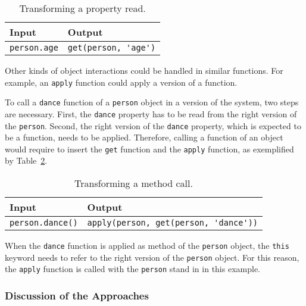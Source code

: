 \begin{table}[h]
\begin{center}
\begin{tabular}{| l | l |}
    \hline
    Input & Output \\ \hline
    \lstinline|person.age| & \lstinline|get(person, 'age')| \\ \hline
\end{tabular}
\end{center}
\caption[Table caption text]{Transforming a property read.}
\label{table:transformingReads}
\end{table}


Other kinds of object interactions could be handled in similar functions.
For example, an \lstinline{apply} function could apply a version of a function.

To call a \lstinline{dance} function of a \lstinline{person} object in a version of the system, two steps are necessary.
First, the \lstinline{dance} property has to be read from the right version of the \lstinline{person}.
Second, the right version of the \lstinline{dance} property, which is expected to be a function, needs to be applied.
Therefore, calling a function of an object would require to insert the \lstinline{get} function and the \lstinline{apply} function, as exemplified by Table~\ref{table:transformingMethodCall}.

\begin{table}[h]
\begin{center}
\begin{tabular}{| l | l |}
    \hline
    Input & Output \\ \hline
    \lstinline|person.dance()| & \lstinline|apply(person, get(person, 'dance'))| \\ \hline
\end{tabular}
\end{center}
\caption[Table caption text]{Transforming a method call.}
\label{table:transformingMethodCall}
\end{table}

When the \lstinline{dance} function is applied as method of the \lstinline{person} object, the \lstinline{this} keyword needs to refer to the right version of the \lstinline{person} object.
For this reason, the \lstinline{apply} function is called with the \lstinline{person} stand in in this example.

\subsubsection{Discussion of the Approaches}


